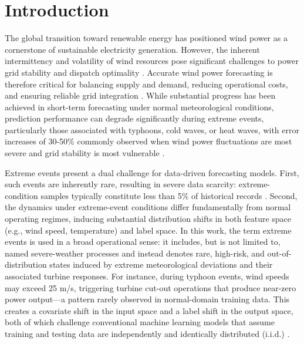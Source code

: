 \documentclass[a4paper]{cas-sc}
\begin{document}
\maketitle

\section{Introduction}

The global transition toward renewable energy has positioned wind power as a cornerstone of sustainable electricity generation. However, the inherent intermittency and volatility of wind resources pose significant challenges to power grid stability and dispatch optimality \citep{yuan2023conditional}. Accurate wind power forecasting is therefore critical for balancing supply and demand, reducing operational costs, and ensuring reliable grid integration \citep{petersen2026offshore, wen2026value}. While substantial progress has been achieved in short-term forecasting under normal meteorological conditions, prediction performance can degrade significantly during extreme events, particularly those associated with typhoons, cold waves, or heat waves, with error increases of 30-50\% commonly observed when wind power fluctuations are most severe and grid stability is most vulnerable \citep{yan2025economic, jonkers2024regional}.

Extreme events present a dual challenge for data-driven forecasting models. First, such events are inherently rare, resulting in severe data scarcity: extreme-condition samples typically constitute less than 5\% of historical records \citep{s41597-022-01696-6}. Second, the dynamics under extreme-event conditions differ fundamentally from normal operating regimes, inducing substantial distribution shifts in both feature space (e.g., wind speed, temperature) and label space. In this work, the term extreme events is used in a broad operational sense: it includes, but is not limited to, named severe-weather processes and instead denotes rare, high-risk, and out-of-distribution states induced by extreme meteorological deviations and their associated turbine responses. For instance, during typhoon events, wind speeds may exceed 25 m/s, triggering turbine cut-out operations that produce near-zero power output---a pattern rarely observed in normal-domain training data. This creates a covariate shift in the input space and a label shift in the output space, both of which challenge conventional machine learning models that assume training and testing data are independently and identically distributed (i.i.d.) \citep{mustaffa2025rf, chen2025brf}.
\end{document}
